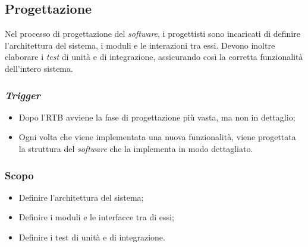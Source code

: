 \subsection{Progettazione}
\label{progettazione}
Nel processo di progettazione del \textit{software}, i progettisti sono incaricati di definire l'architettura del sistema, i moduli e le interazioni tra essi. 
Devono inoltre elaborare i \textit{test} di unità e di integrazione, assicurando così la corretta funzionalità dell'intero sistema.

\subsubsection{\textit{Trigger}}

\begin{itemize}
	\item Dopo l'RTB avviene la fase di progettazione più vasta, ma non in
	      dettaglio;

	\item Ogni volta che viene implementata una nuova funzionalità, viene
	      progettata la struttura del \textit{software} che la implementa in
	      modo dettagliato.
\end{itemize}

\subsubsection{Scopo}
\begin{itemize}
	\item Definire l'architettura del sistema;
	\item Definire i moduli e le interfacce tra di essi;
	\item Definire i test di unità e di integrazione.
\end{itemize}

